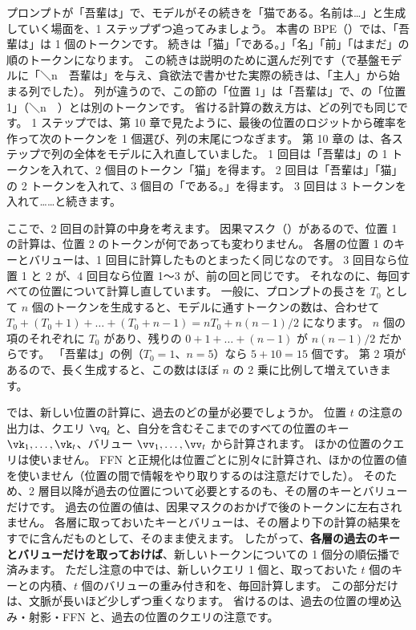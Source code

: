 プロンプトが「吾輩は」で、モデルがその続きを「猫である。名前は…」と生成していく場面を、1 ステップずつ追ってみましょう。
本書の BPE（）では、「吾輩は」は 1 個のトークンです。
続きは「猫」「である。」「名」「前」「はまだ」の順のトークンになります。
この続きは説明のために選んだ列です（で基盤モデルに「＼n　吾輩は」を与え、貪欲法で書かせた実際の続きは、「主人」から始まる列でした）。
列が違うので、この節の「位置 1」は「吾輩は」で、の「位置 1」（＼n　）とは別のトークンです。
省ける計算の数え方は、どの列でも同じです。
1 ステップでは、第 10 章で見たように、最後の位置のロジットから確率を作って次のトークンを 1 個選び、列の末尾につなぎます。
第 10 章の  は、各ステップで列の全体をモデルに入れ直していました。
1 回目は「吾輩は」の 1 トークンを入れて、2 個目のトークン「猫」を得ます。
2 回目は「吾輩は」「猫」の 2 トークンを入れて、3 個目の「である。」を得ます。
3 回目は 3 トークンを入れて……と続きます。

ここで、2 回目の計算の中身を考えます。
因果マスク（）があるので、位置 1 の計算は、位置 2 のトークンが何であっても変わりません。
各層の位置 1 のキーとバリューは、1 回目に計算したものとまったく同じなのです。
3 回目なら位置 1 と 2 が、4 回目なら位置 1〜3 が、前の回と同じです。
それなのに、毎回すべての位置について計算し直しています。
一般に、プロンプトの長さを $T_0$ として $n$ 個のトークンを生成すると、モデルに通すトークンの数は、合わせて $T_0+(T_0+1)+\dots+(T_0+n-1)=nT_0+n(n-1)/2$ になります。
$n$ 個の項のそれぞれに $T_0$ があり、残りの $0+1+\dots+(n-1)$ が $n(n-1)/2$ だからです。
「吾輩は」の例（$T_0=1$、$n=5$）なら $5+10=15$ 個です。
第 2 項があるので、長く生成すると、この数はほぼ $n$ の 2 乗に比例して増えていきます。

では、新しい位置の計算に、過去のどの量が必要でしょうか。
位置 $t$ の注意の出力は、クエリ $\vq_t$ と、自分を含むそこまでのすべての位置のキー $\vk_1,\dots,\vk_t$、バリュー $\vv_1,\dots,\vv_t$ から計算されます。
ほかの位置のクエリは使いません。
FFN と正規化は位置ごとに別々に計算され、ほかの位置の値を使いません（位置の間で情報をやり取りするのは注意だけでした）。
そのため、2 層目以降が過去の位置について必要とするのも、その層のキーとバリューだけです。
過去の位置の値は、因果マスクのおかげで後のトークンに左右されません。
各層に取っておいたキーとバリューは、その層より下の計算の結果をすでに含んだものとして、そのまま使えます。
したがって、\textbf{各層の過去のキーとバリューだけを取っておけば}、新しいトークンについての 1 個分の順伝播で済みます。
ただし注意の中では、新しいクエリ 1 個と、取っておいた $t$ 個のキーとの内積、$t$ 個のバリューの重み付き和を、毎回計算します。
この部分だけは、文脈が長いほど少しずつ重くなります。
省けるのは、過去の位置の埋め込み・射影・FFN と、過去の位置のクエリの注意です。

